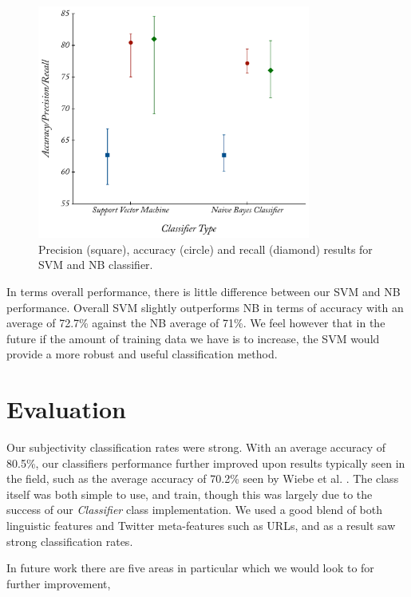 \begin{figure}
	\caption{Precision (square), accuracy (circle) and recall (diamond) results for SVM and NB classifier.}
	\label{fig:subj_class}
	\centering
		\includegraphics[width=0.8\textwidth]{graphs/subj_class.pdf}
\end{figure}

In terms overall performance, there is little difference between our SVM and NB performance. Overall SVM slightly outperforms NB in terms of accuracy with an average of 72.7\% against the NB average of 71\%. We feel however that in the future if the amount of training data we have is to increase, the SVM would provide a more robust and useful classification method.

\section{Evaluation}

Our subjectivity classification rates were strong. With an average accuracy of 80.5\%, our classifiers performance further improved upon results typically seen in the field, such as the average accuracy of 70.2\% seen by Wiebe et al. \cite{Wiebe:2000tk}. The class itself was both simple to use, and train, though this was largely due to the success of our \emph{Classifier} class implementation. We used a good blend of both linguistic features and Twitter meta-features such as URLs, and as a result saw strong classification rates.

In future work there are five areas in particular which we would look to for further improvement,


